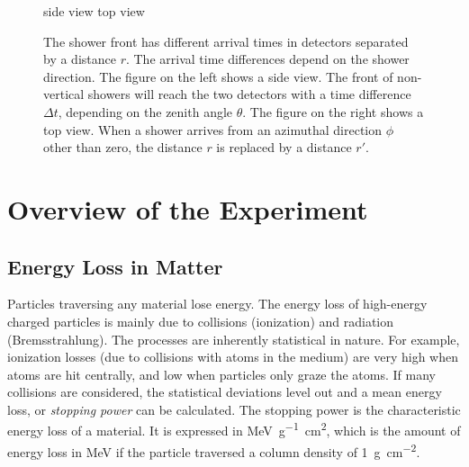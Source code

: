 \begin{figure}
\centering



\textsf{side view}
\textsf{top view}

\caption{The shower front has different arrival times in
detectors separated by a distance $r$.
The arrival time differences depend on the shower direction. The figure on the
left shows a side view. The front of non-vertical showers
will reach the two detectors with a time difference
$\Delta t$, depending on the zenith angle $\theta$. The figure on the right
shows a top view. When a shower arrives from an azimuthal direction $\phi$
other than zero, the distance $r$ is replaced by a distance $r'$.}
\label{fig:front-at-stations}
\end{figure}


\section{Overview of the Experiment}
\label{sec:hisparc-overview}

\subsection{Energy Loss in Matter}
\label{sec:energy-loss}

Particles traversing any material lose energy.  The energy loss of high-energy
charged particles is mainly due to collisions (ionization) and radiation
(Bremsstrahlung).   The processes are inherently statistical in nature.  For
example, ionization losses (due to collisions with atoms in the medium) are very
high when atoms are hit centrally, and low when particles only graze the atoms.
If many collisions are considered, the statistical deviations level out and a
mean energy loss, or \emph{stopping power} can be calculated.
The stopping power is the characteristic energy loss of a material.  It is
expressed in \si{\mega\electronvolt\per\gram\centi\meter\squared}, which is the
amount of energy loss in \si{\mega\electronvolt} if the particle traversed a
column density of \SI{1}{\gram\per\centi\meter\squared}.

